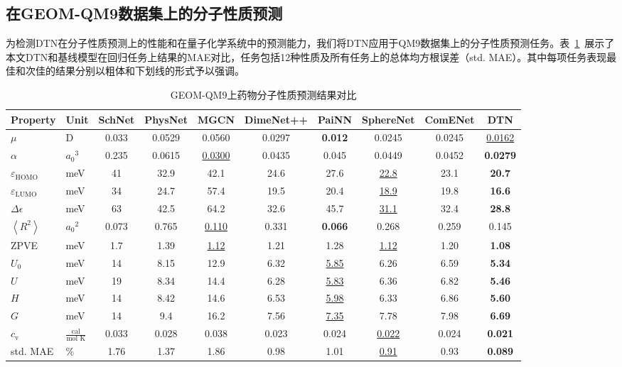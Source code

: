 \subsection{在GEOM-QM9数据集上的分子性质预测}
为检测DTN在分子性质预测上的性能和在量子化学系统中的预测能力，我们将DTN应用于QM9数据集上的分子性质预测任务。表~\ref{tab:reg_qm9}~展示了本文DTN和基线模型在回归任务上结果的MAE对比，任务包括12种性质及所有任务上的总体均方根误差（std. MAE）。其中每项任务表现最佳和次佳的结果分别以粗体和下划线的形式予以强调。

\begin{table}[h]
    \begin{center}
    \caption{GEOM-QM9上药物分子性质预测结果对比}
    \label{tab:reg_qm9}
    \resizebox{\textwidth}{!}
    {\begin{tabular}{llcccccccc}
    \toprule
    Property & Unit & SchNet & PhysNet & MGCN & DimeNet++ & PaiNN & SphereNet & ComENet & DTN \\
    \midrule
    $\mu$ & D & 0.033 & 0.0529 & 0.0560 & 0.0297 & \textbf{0.012} & 0.0245 & 0.0245 & \underline{0.0162} \\
    $\alpha$ & ${a_0}^3$ & 0.235 & 0.0615 & \underline{0.0300} & 0.0435 & 0.045 & 0.0449 & 0.0452 & \textbf{0.0279} \\
    $\varepsilon_\text{HOMO}$ & meV & 41 & 32.9 & 42.1 & 24.6 & 27.6 & \underline{22.8} & 23.1 & \textbf{20.7} \\
    $\varepsilon_\text{LUMO}$ & meV & 34 & 24.7 & 57.4 & 19.5 & 20.4 & \underline{18.9} & 19.8 & \textbf{16.6} \\
    $\Delta\epsilon$ & meV & 63 & 42.5 & 64.2 & 32.6 & 45.7 & \underline{31.1} & 32.4 & \textbf{28.8} \\
    $\left< R^2 \right>$ & ${a_0}^2$ & 0.073 & 0.765 & \underline{0.110} & 0.331 & \textbf{0.066} & 0.268 & 0.259 & 0.145 \\
    ZPVE & meV & 1.7 & 1.39 & \underline{1.12} & 1.21 & 1.28 & \underline{1.12} & 1.20 & \textbf{1.08} \\
    $U_0$ & meV & 14 & 8.15 & 12.9 & 6.32 & \underline{5.85} & 6.26 & 6.59 & \textbf{5.34} \\
    $U$ &meV    & 19 & 8.34 & 14.4 & 6.28 & \underline{5.83} & 6.36 & 6.82 & \textbf{5.46} \\
    $H$ &meV    & 14 & 8.42 & 14.6 & 6.53 & \underline{5.98} & 6.33 & 6.86 & \textbf{5.60} \\
    $G$ &meV    & 14 & 9.4 & 16.2 & 7.56 & \underline{7.35} & 7.78 & 7.98 & \textbf{6.69} \\
    $c_\text{v}$ & $\frac{\mbox{cal}}{\mbox{mol K}}$ & 0.033 & 0.028 & 0.038 & 0.023 & 0.024 & \underline{0.022} & 0.024 & \textbf{0.021} \\
    \midrule
    std. MAE & \% & 1.76 & 1.37 & 1.86 & 0.98 & 1.01 & \underline{0.91} & 0.93 & \textbf{0.089} \\
    \bottomrule
    \end{tabular}}
    \end{center}
    \vspace{-10 pt}
    \end{table}

